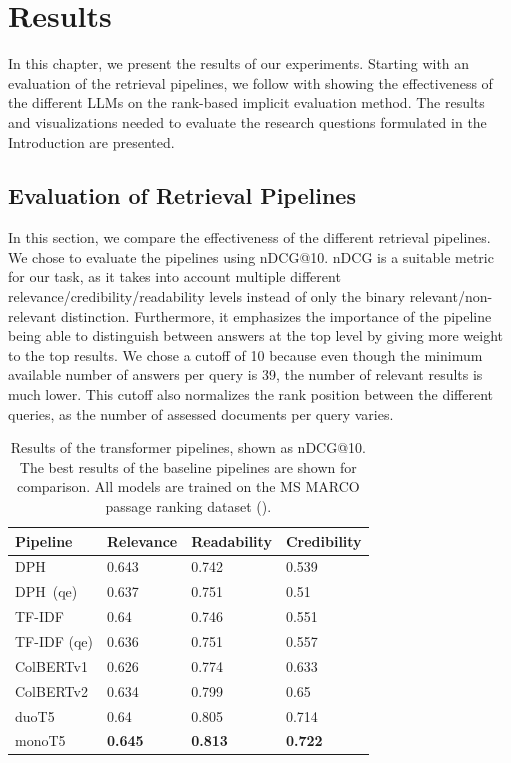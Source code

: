 \chapter{Results}\label{chapter:results}
In this chapter, we present the results of our experiments.
Starting with an evaluation of the retrieval pipelines, we follow with showing the effectiveness of the different LLMs on the rank-based implicit evaluation method.
The results and visualizations needed to evaluate the research questions formulated in the Introduction are presented.

\section{Evaluation of Retrieval Pipelines}
In this section, we compare the effectiveness of the different retrieval pipelines.
We chose to evaluate the pipelines using nDCG@10.
nDCG is a suitable metric for our task, as it takes into account multiple different relevance/credibility/readability levels instead of only the binary relevant/non-relevant distinction.
Furthermore, it emphasizes the importance of the pipeline being able to distinguish between answers at the top level by giving more weight to the top results.
We chose a cutoff of 10 because even though the minimum available number of answers per query is 39, the number of relevant results is much lower.
This cutoff also normalizes the rank position between the different queries, as the number of assessed documents per query varies.
\begin{table}[tb]
\centering
\begin{tabularx}{\textwidth}{lXXX}
\hline
Pipeline    & Relevance          & Readability        & Credibility        \\ \hline
DPH         & 0.643 & 0.742 & 0.539 \\
DPH\ (qe)     & 0.637 & 0.751 & 0.51  \\
TF-IDF     & 0.64  & 0.746 & 0.551 \\
TF-IDF (qe) & 0.636 & 0.751 & 0.557 \\
ColBERTv1      & 0.626 & 0.774 & 0.633 \\
ColBERTv2       & 0.634 & 0.799 & 0.65  \\
duoT5            & 0.64  & 0.805 & 0.714 \\
monoT5           & \textbf{0.645} & \textbf{0.813} & \textbf{0.722} \\
\hline
\end{tabularx}
\caption{Results of the transformer pipelines, shown as nDCG@10. The best results of the baseline pipelines are shown for comparison. All models are trained on the MS MARCO passage ranking dataset (\cite{bajaj:2016:MSMARCO}).}
\label{tab:transformer_pipelines}
\end{table}
